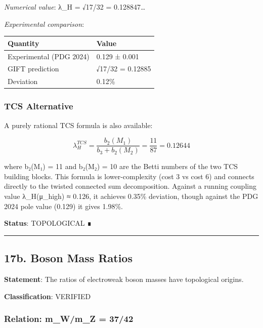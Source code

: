 \documentclass[11pt,a4paper]{article}
\begin{document}
\emph{Numerical value}: λ\_H = √17/32 = 0.128847\ldots{}

\emph{Experimental comparison}:

{\def\LTcaptype{none} %
\begin{longtable}[]{@{}ll@{}}
\toprule\noalign{}
Quantity & Value \\
\midrule\noalign{}
\endhead
\bottomrule\noalign{}
\endlastfoot
Experimental (PDG 2024) & 0.129 ± 0.001 \\
GIFT prediction & √17/32 = 0.12885 \\
Deviation & 0.12\% \\
\end{longtable}
}

\subsubsection{TCS Alternative}\label{tcs-alternative}

A purely rational TCS formula is also available:

\[\lambda_H^{TCS} = \frac{b_2(M_1)}{b_3 + b_2(M_2)} = \frac{11}{87} = 0.12644\]

where b₂(M₁) = 11 and b₂(M₂) = 10 are the Betti numbers of the two TCS building blocks. This formula is lower-complexity (cost 3 vs cost 6) and connects directly to the twisted connected sum decomposition. Against a running coupling value λ\_H(μ\_high) ≈ 0.126, it achieves 0.35\% deviation, though against the PDG 2024 pole value (0.129) it gives 1.98\%.

\textbf{Status}: TOPOLOGICAL ∎

\begin{center}\rule{0.5\linewidth}{0.5pt}\end{center}

\subsection{17b. Boson Mass Ratios}\label{b.-boson-mass-ratios}

\textbf{Statement}: The ratios of electroweak boson masses have topological origins.

\textbf{Classification}: VERIFIED

\subsubsection{Relation: m\_W/m\_Z = 37/42}\label{relation-m_wm_z-3742}
\end{document}

